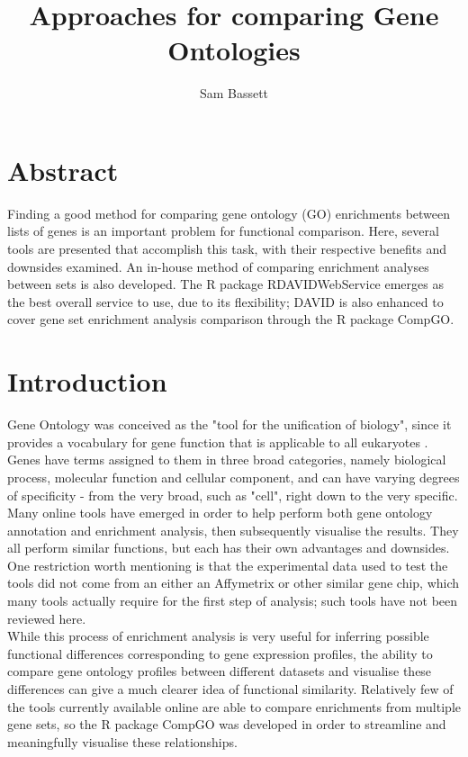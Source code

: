 \documentclass[11pt, oneside]{article}
\title{Approaches for comparing Gene Ontologies}
\author{Sam Bassett}
\affil{Developmental and Stem Cell Biology Lab,\\Victor Chang Cardiac Research Institute,\\Darlinghurst, Sydney, Australia}
\date{}
\begin{document}
\maketitle
\section*{Abstract}
Finding a good method for comparing gene ontology (GO) enrichments between lists of genes is an important problem for functional comparison. Here, several tools are presented that accomplish this task, with their respective benefits and downsides examined. An in-house method of comparing enrichment analyses between sets is also developed. The R package RDAVIDWebService emerges as the best overall service to use, due to its flexibility; DAVID is also enhanced to cover gene set enrichment analysis comparison through the R package CompGO.
\section*{Introduction}
Gene Ontology was conceived as the "tool for the unification of biology", since it provides a vocabulary for gene function that is applicable to all eukaryotes \cite{GOConsort00}. Genes have terms assigned to them in three broad categories, namely biological process, molecular function and cellular component, and can have varying degrees of specificity - from the very broad, such as "cell", right down to the very specific.\\

Many online tools have emerged in order to help perform both gene ontology annotation and enrichment analysis, then subsequently visualise the results. They all perform similar functions, but each has their own advantages and downsides. One restriction worth mentioning is that the experimental data used to test the tools did not come from an either an Affymetrix or other similar gene chip, which many tools actually require for the first step of analysis; such tools have not been reviewed here.\\

While this process of enrichment analysis is very useful for inferring possible functional differences corresponding to gene expression profiles, the ability to compare gene ontology profiles between different datasets and visualise these differences can give a much clearer idea of functional similarity. Relatively few of the tools currently available online are able to compare enrichments from multiple gene sets, so the R package CompGO was developed in order to streamline and meaningfully visualise these relationships. 
\end{document}
